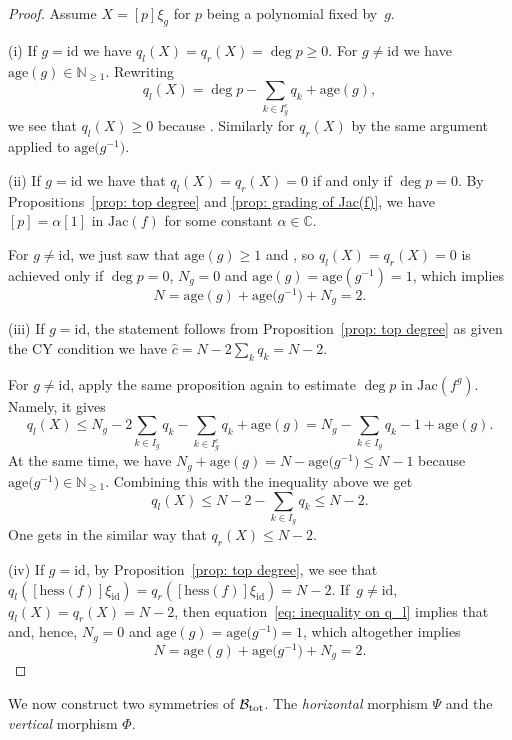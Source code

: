 \documentclass[pdftex]{sigma}
\numberwithin{equation}{section}
\newcommand{\CC}{{\mathbb{C}}}
\newcommand{\NN}{{\mathbb{N}}}
\newcommand{\Jac}{\mathrm{Jac}}
\newcommand{\id}{\mathrm{id}}
\newcommand{\hess}{\mathrm{hess}}
\newcommand{\age}{\mathrm{age}}
\def\B{{\mathcal B}}
\begin{document}
\begin{proof}
	Assume $X = [p]\xi_g$ for $p$ being a polynomial fixed by~$g$.

	(i) If $g = \id$ we have $q_l(X) = q_r(X) = \deg p \ge 0$. For $g \neq \id$ we have $\age(g) \in \NN_{\ge 1}$. Rewriting
	\[
		q_l(X) = \deg p -\sum_{k \in I_g^c} q_{k} + \age(g),
	\]
	we see that $q_l(X) \ge 0$ because . Similarly for $q_r(X)$ by the same argument applied to $\age\bigl(g^{-1}\bigr)$.

	(ii) If $g = \id$ we have that $q_l(X) = q_r(X) = 0$ if and only if $\deg p = 0$. By Propositions~\ref{prop: top degree} and \ref{prop: grading of Jac(f)}, we have $[p] = \alpha [1]$ in $\Jac(f)$ for some constant $\alpha \in \CC$.

	For $g \neq \id$, we just saw that $\age(g)\ge 1$ and , so $q_l(X) = q_r(X) = 0$ is achieved only if $\deg p=0$, $N_g=0$ and $\age(g)=\age(g^{-1})=1$, which implies \[N=\age(g)+\age\bigl(g^{-1}\bigr)+N_g=2.\]


	(iii) If $g=\id$, the statement follows from Proposition~\ref{prop: top degree} as given the CY condition we have $\hat{c}=N-2\sum_k q_k=N-2$.

 For $g \neq \id $, apply the same proposition again to estimate $\deg p$ in $\Jac(f^g)$. Namely, it gives
	\[
		q_l(X) \le N_g - 2\sum_{k \in I_g}q_k - \sum_{k \in I_g^c} q_{k}+ \age(g) = N_g - \sum_{k \in I_g}q_k -1 + \age(g).
	\]
	At the same time, we have $N_g + \age(g) = N - \age\bigl(g^{-1}\bigr) \le N-1$ because $\age\bigl(g^{-1}\bigr) \in \NN_{\ge 1}$. Combining this with the inequality above we get
\begin{equation}\label{eq: inequality on q_l}
		q_l(X) \le N - 2 - \sum_{k \in I_g}q_k \le N - 2.
\end{equation}
	One gets in the similar way that $q_r(X) \le N-2$.

	(iv) If $g = \id$, by Proposition~\ref{prop: top degree}, we see that $q_l([\hess(f)]\xi_\id)=q_r([\hess(f)]\xi_\id)=N-2$. If~$g \neq \id$, $q_l(X) = q_r(X) = N-2$, then equation~\eqref{eq: inequality on q_l} implies that  and, hence, $N_g=0$ and $\age(g)=\age\bigl(g^{-1}\bigr)=1$, which altogether implies \[N=\age(g)+\age\bigl(g^{-1}\bigr)+N_g=2.\tag*{\qed} \]\renewcommand{\qed}{}
\end{proof}

We now construct two symmetries of $\B_{\rm tot}$. The \textit{horizontal} morphism $\Psi$ and the \textit{vertical} morphism $\Phi$.
\end{document}
